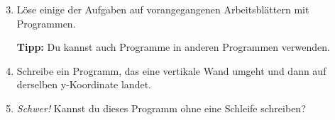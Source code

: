 \begin{enumerate}\setcounter{enumi}{2}
	\item Löse einige der Aufgaben auf vorangegangenen Arbeitsblättern mit Programmen.
	
	\textbf{Tipp:} Du kannst auch Programme in anderen Programmen verwenden.
	\item Schreibe ein Programm, das eine vertikale Wand umgeht und dann auf derselben y-Koordinate landet.
	\item \optional \emph{Schwer!} Kannst du dieses Programm ohne eine Schleife schreiben?
\end{enumerate}
